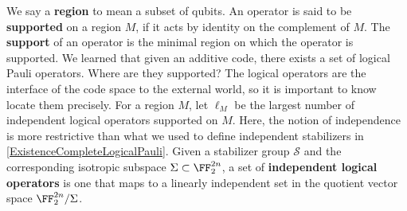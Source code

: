 We say a {\bf region} to mean a subset of qubits.
An operator is said to be {\bf supported} on a region $M$,
if it acts by identity on the complement of $M$.
The {\bf support} of an operator is the minimal region on which the operator is supported.
We learned that given an additive code, there exists a set of logical Pauli operators.
Where are they supported?
The logical operators are the interface of the code space to the external world,
so it is important to know locate them precisely.
For a region $M$, let $\ell_M$ be the largest number of independent logical operators supported on $M$.
Here, the notion of independence is more restrictive than 
what we used to define independent stabilizers in \ref{ExistenceCompleteLogicalPauli}.
Given a stabilizer group $\mathcal S$ and the corresponding isotropic subspace $\Sigma \subset \FF_2^{2n}$,
a set of {\bf independent logical operators} is one that maps to
a linearly independent set in the quotient vector space $\FF_2^{2n} / \Sigma$.

